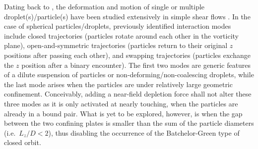 Dating back to  \cite{Taylor501}, the deformation and motion of single or multiple droplet(s)/particle(s) have been studied extensively in simple shear flows \citep{lin_lee_sather_1970,batchelor_green_1972,batchelor_green_1972b,Zinchenko1983,Zinchenko1984,zurita-gotor_2007}. In the case of spherical particles/droplets, previously identified interaction modes include closed trajectories (particles rotate around each other in the vorticity plane), open-and-symmetric trajectories (particles return to their original $z$ positions after passing each other), and swapping trajectories (particles exchange the $z$ position after a binary encounter). The first two modes are generic features of a dilute suspension of particles or non-deforming/non-coalescing droplets, while the last mode arises when the particles are under relatively large geometric confinement. Conceivably, adding a near-field depletion force shall not alter these three modes as it is only activated at nearly touching, when the particles are already in a bound pair. What is yet to be explored, however, is when the gap between the two confining plates is smaller than the sum of the particle diameters (i.e.\ $L_z/D<2$), thus disabling the occurrence of the Batchelor-Green type of closed orbit.


